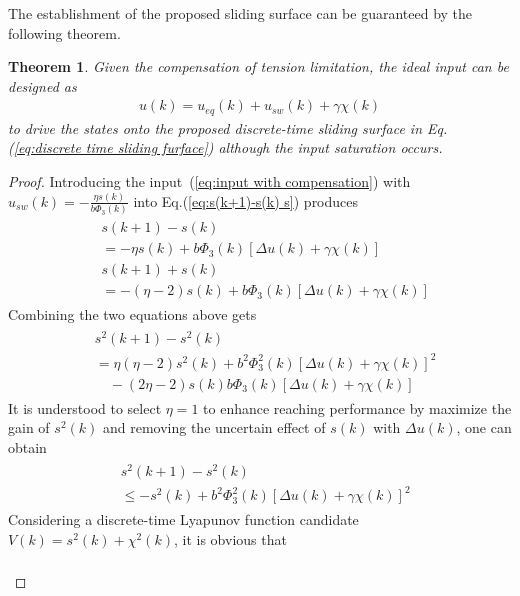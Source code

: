 \documentclass[10pt,onecolumn,draftcls]{IEEEtran}
\newtheorem{mythm}{Theorem}
\begin{document}
The establishment  of the proposed sliding surface can be guaranteed by the following theorem.

\begin{mythm}
Given the compensation of tension limitation, the ideal input can be designed as  
\begin{align}\label{eq:input with compensation}
	u(k) = u_{eq}(k)+u_{sw}(k)+\gamma\chi(k)
\end{align}
to drive the states onto the proposed discrete-time sliding surface in Eq.(\ref{eq:discrete time sliding furface}) although the input saturation occurs.
\end{mythm}
\begin{proof}
Introducing the input~(\ref{eq:input with compensation}) with $u_{sw}(k)=-\frac{\eta s(k)}{b\Phi_3(k)}$ into Eq.(\ref{eq:s(k+1)-s(k) s}) produces
\begin{align}\begin{split}
	&s(k+1)-s(k) \\
	&= -\eta s(k)+b\Phi_3(k)\left[\Delta u(k)+\gamma\chi(k)\right]\\
	&s(k+1)+s(k) \\
	&= -(\eta-2) s(k)+b\Phi_3(k)\left[\Delta u(k)+\gamma\chi(k)\right]
\end{split}\end{align}
Combining the two equations above gets
\begin{align}\begin{split}
	&s^2(k+1)-s^2(k) \\
	&= \eta(\eta-2)s^2(k)+b^2\Phi_3^2(k)\left[\Delta u(k)+\gamma\chi(k)\right]^2\\
	&\quad-(2\eta-2)s(k)b\Phi_3(k)\left[\Delta u(k)+\gamma\chi(k)\right]
\end{split}\end{align}
It is understood to select $\eta=1$ to enhance reaching performance by maximize the gain of $s^2(k)$ and removing the uncertain effect of $s(k)$ with $\Delta u(k)$, one can obtain
\begin{align}\begin{split}
	&s^2(k+1)-s^2(k) \\
	&\le -s^2(k)+b^2\Phi_3^2(k)\left[\Delta u(k)+\gamma\chi(k)\right]^2
\end{split}\end{align}
Considering a discrete-time Lyapunov function candidate $V(k) = s^2(k)+\chi^2(k)$, it is obvious that
\begin{align}\begin{split}\label{eq:V(k+1)-V(k)}

\end{split}
\end{align}
\end{proof}
\end{document}
